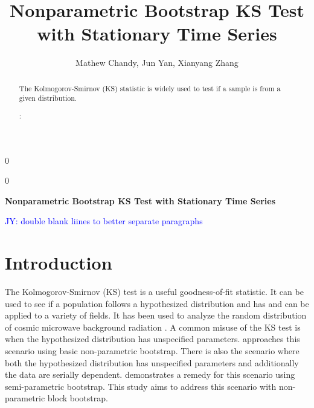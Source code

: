\documentclass[12pt, letterpaper]{article}
\newcommand{\jy}[1]{\textcolor{blue}{JY: #1}}
\newcommand{\blind}{0}
\begin{document}

\blind
{
  \title{\bf Nonparametric Bootstrap KS Test with Stationary Time Series}
  \author{Mathew Chandy, %
  Jun Yan, %
  Xianyang Zhang\\
}
\date{}
  \maketitle
} \fi

\blind
{
  \bigskip
  \bigskip
  \bigskip
  \begin{center}
    {\LARGE\bf Nonparametric Bootstrap KS Test with Stationary Time Series}
\end{center}
  \bigskip
} \fi


\doublespace

\begin{abstract}

The Kolmogorov-Smirnov (KS) statistic is widely used to test if a sample is
from a given distribution.


\bigskip
{}:
\end{abstract}


\jy{double blank liines to better separate paragraphs}

\section{Introduction}
\label{sec:intro}

The Kolmogorov-Smirnov (KS) test is a useful goodness-of-fit statistic. It 
can be used to see if a population follows a hypothesized distribution and has 
and can be applied to a variety of fields. It has
been used to analyze the random distribution of cosmic microwave background 
radiation \citep{naess2012application}. A common misuse of the KS test is when
the hypothesized distribution has unspecified parameters. 
\citet{babu2004goodness} approaches this scenario using basic 
non-parametric bootstrap. There is also the scenario where both the hypothesized 
distribution has unspecified parameters and additionally the data are 
serially dependent. \citet{zeimbekakis2022misuses} demonstrates a remedy for
this scenario using semi-parametric bootstrap. This study aims to address this
scenario with non-parametric block bootstrap.
\end{document}
